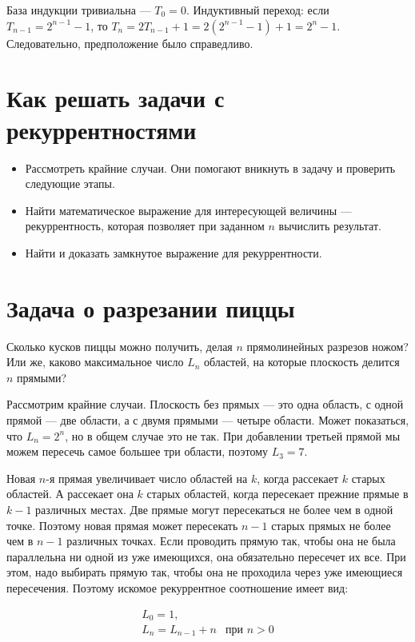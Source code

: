\documentclass[14pt,openany]{book}
\begin{document}
База индукции тривиальна --- $T_0 = 0$. Индуктивный переход: если $T_{n-1}=2^{n-1}-1$, то
$T_n = 2T_{n-1}+1 = 2(2^{n-1}-1)+1 = 2^n - 1$. Следовательно, предположение было справедливо.

\section{Как решать задачи с рекуррентностями}

\begin{itemize}
\item Рассмотреть крайние случаи. Они помогают вникнуть в задачу и проверить
      следующие этапы.
\item Найти математическое выражение для интересующей величины ---
      рекуррентность, которая позволяет при заданном $n$ вычислить результат.
\item Найти и доказать замкнутое выражение для рекуррентности.
\end{itemize}

\section{Задача о разрезании пиццы}

Сколько кусков пиццы можно получить, делая $n$ прямолинейных разрезов ножом?
Или же, каково максимальное число $L_n$ областей, на которые плоскость делится
$n$ прямыми?

Рассмотрим крайние случаи. Плоскость без прямых --- это одна область, 
с одной прямой --- две области, а с двумя прямыми --- четыре области.
Может показаться, что $L_n = 2^n$, но в общем случае это не так.
При добавлении третьей прямой мы можем пересечь самое большее три области,
поэтому $L_3 = 7$.

Новая $n$-я прямая увеличивает число областей на $k$, когда рассекает $k$ старых
областей. А рассекает она $k$ старых областей, когда пересекает прежние прямые
в $k-1$ различных местах. Две прямые могут пересекаться не более чем в одной точке.
Поэтому новая прямая может пересекать $n-1$ старых прямых не более чем в $n-1$
различных точках. Если проводить прямую так, чтобы она не была параллельна ни одной
из уже имеющихся, она обязательно пересечет их все. При этом, надо выбирать прямую так,
чтобы она не проходила через уже имеющиеся пересечения. Поэтому искомое рекуррентное
соотношение имеет вид:

\begin{equation}
\label{formula-pizza-rec}
\begin{array}{ll}
L_0 = 1, \\
L_n = L_{n-1} + n & \text{при } n > 0 \\
\end{array}
\end{equation}
\end{document}
